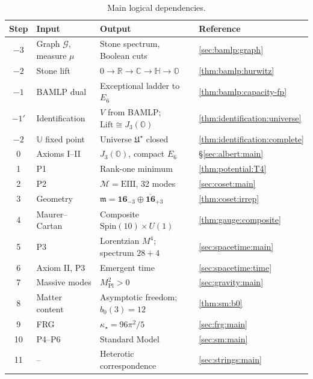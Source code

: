 \documentclass[11pt]{article}
\renewcommand{\arraystretch}{1.18}
\theoremstyle{plain}
\theoremstyle{definition}
\theoremstyle{remark}
\begin{document}
\begin{table}[t]
  \centering
  \small
  \renewcommand{\arraystretch}{1.22}
  \begin{tabular}{@{}clll@{}}
    \toprule
    Step & Input & Output & Reference \\
    \midrule
    $-3$ & Graph $\mathcal{G}$, measure $\mu$ & Stone spectrum, Boolean cuts &
      \autoref{sec:bamlp:graph} \\
    $-2$ & Stone lift & $0\to\mathbb{R}\to\mathbb{C}\to\mathbb{H}\to\mathbb{O}$ &
      \autoref{thm:bamlp:hurwitz} \\
    $-1$ & BAMLP dual & Exceptional ladder to $E_6$ &
      \autoref{thm:bamlp:capacity-fp} \\
    $-1'$ & Identification & $V$ from BAMLP; $\mathrm{Lift}\cong J_3(\mathbb O)$ &
      \autoref{thm:identification:universe} \\
    $-2$ & $\mathbb{U}$ fixed point & Universe $\mathfrak{U}^\star$ closed &
      \autoref{thm:identification:complete} \\
    0 & Axioms I--II & $J_3(\mathbb O)$, compact $E_6$ & \S\ref{sec:albert:main} \\
    1 & P1 & Rank-one minimum & \autoref{thm:potential:T4} \\
    2 & P2 & $\mathcal M=\mathrm{EIII}$, 32 modes & \autoref{sec:coset:main} \\
    3 & Geometry & $\mathfrak m=\mathbf{16}_{-3}\oplus\overline{\mathbf{16}}_{+3}$ & \autoref{thm:coset:irrep} \\
    4 & Maurer--Cartan & Composite $\mathrm{Spin}(10)\times U(1)$ & \autoref{thm:gauge:composite} \\
    5 & P3 & Lorentzian $M^4$; spectrum $28+4$ & \autoref{sec:spacetime:main} \\
    6 & Axiom II, P3 & Emergent time & \autoref{sec:spacetime:time} \\
    7 & Massive modes & $M_{\mathrm{Pl}}^2>0$ & \autoref{sec:gravity:main} \\
    8 & Matter content & Asymptotic freedom; $b_0(3)=12$ & \autoref{thm:sm:b0} \\
    9 & FRG & $\kappa_\star=96\pi^2/5$ & \autoref{sec:frg:main} \\
    10 & P4--P6 & Standard Model & \autoref{sec:sm:main} \\
    11 & -- & Heterotic correspondence & \autoref{sec:strings:main} \\
    \bottomrule
  \end{tabular}
  \caption{Main logical dependencies.}
  \label{tab:master:chain}
\end{table}
\end{document}
